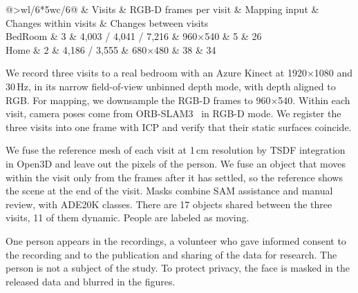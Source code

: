\documentclass[10pt,onecolumn,letterpaper]{article}
\makeatletter
\renewcommand\paragraph{\@startsection{paragraph}{4}{\z@}{1.5ex \@plus .5ex \@minus .2ex}{-1em}{\normalfont\normalsize\bfseries}}
\makeatother
\begin{document}
\begin{table}[H]
\centering
\small
\setlength{\tabcolsep}{3pt}
\def\resultrows{
\toprule
 & Visits & RGB-D frames per visit & Mapping input & Changes within visits & Changes between visits \\
\midrule
BedRoom & 3 & 4,003 / 4,041 / 7,216 & 960$\times$540 & 5 & 26 \\
Home & 2 & 4,186 / 3,555 & 680$\times$480 & 38 & 34 \\
\bottomrule
}
\setlength{\tabcolsep}{0pt}
\begin{tabular}{@{}>{\hspace{6pt}}wl{\dimexpr\linewidth/6\relax}*{5}{wc{\dimexpr\linewidth/6\relax}}@{}}\resultrows\end{tabular}
\vspace{-2mm}
\caption{\textbf{ReviScene.} Both record RGB-D at 30\,Hz. The changes are the reference changes made while the camera
looks away, as in \cref{fig:supp_change_kinds}. Home also has three motions in view.}
\label{tab:supp_datasets}
\vspace{-2mm}
\end{table}

\paragraph{ReviScene-BedRoom.}
We record three visits to a real bedroom with an Azure Kinect at 1920$\times$1080 and 30\,Hz, in its narrow
field-of-view unbinned depth mode, with depth aligned to RGB.
For mapping, we downsample the RGB-D frames to 960$\times$540. Within each visit, camera poses come from
ORB-SLAM3~\cite{9440682} in RGB-D mode. We register the three visits into one frame with ICP and verify that their static surfaces coincide.

We fuse the reference mesh of each visit at 1\,cm resolution by TSDF integration in Open3D and leave out the pixels of the person. We fuse an object that moves within the visit only from the frames after it has settled, so the reference shows the scene at the end of the visit.
Masks combine SAM assistance and manual review, with ADE20K classes. There are 17 objects shared between the three visits, 11 of them dynamic. People are
labeled as moving.

One person appears in the recordings, a volunteer who gave informed consent to the recording and to the publication and sharing of the data for research. The person is not a subject of the study. To protect privacy, the face is masked in the released data and blurred in the figures.
\end{document}
